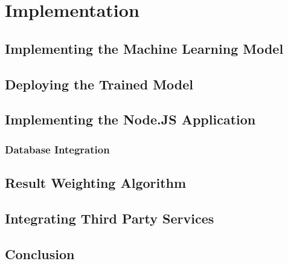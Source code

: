 \chapter{Implementation}


\section{Implementing the Machine Learning Model}

\section{Deploying the Trained Model}

\section{Implementing the Node.JS Application}
\subsection{Database Integration}

\section{Result Weighting Algorithm}

\section{Integrating Third Party Services}

\section{Conclusion}

